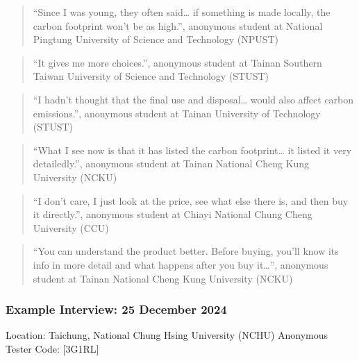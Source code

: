 \documentclass[
  12pt,
  letterpaper,
  DIV=11,
  numbers=noendperiod]{scrartcl}
\begin{document}
\begin{quote}
``Since I was young, they often said\ldots{} if something is made
locally, the carbon footprint won't be as high.'', anonymous student at
National Pingtung University of Science and Technology (NPUST)
\end{quote}

\begin{quote}
``It gives me more choices.'', anonymous student at Tainan Southern
Taiwan University of Science and Technology (STUST)
\end{quote}

\begin{quote}
``I hadn't thought that the final use and disposal\ldots{} would also
affect carbon emissions.'', anonymous student at Tainan University of
Technology (STUST)
\end{quote}

\begin{quote}
``What I see now is that it has listed the carbon footprint\ldots{} it
listed it very detailedly.'', anonymous student at Tainan National Cheng
Kung University (NCKU)
\end{quote}

\begin{quote}
``I don't care, I just look at the price, see what else there is, and
then buy it directly.'', anonymous student at Chiayi National Chung
Cheng University (CCU)
\end{quote}

\begin{quote}
``You can understand the product better. Before buying, you'll know its
info in more detail and what happens after you buy it\ldots{}'',
anonymous student at Tainan National Cheng Kung University (NCKU)
\end{quote}

\subsubsection{Example Interview: 25 December
2024}\label{example-interview-25-december-2024}

Location: Taichung, National Chung Hsing University (NCHU) Anonymous
Tester Code: {[}3G1RL{]}
\end{document}
